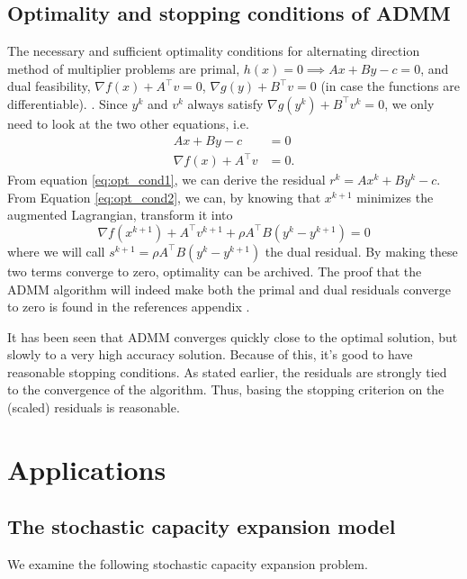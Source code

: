 \documentclass[a4paper]{artikel3}
\begin{document}
\subsection{Optimality and stopping conditions of ADMM}
The necessary and sufficient optimality conditions for alternating  direction  method  of  multiplier problems are primal, $h(x) = 0 \implies Ax + By - c = 0$, and dual feasibility, $\nabla f(x) + A^\top v = 0$, $ \nabla g(y) + B^\top v = 0$ (in case the functions are differentiable). \cite{boyd2011distributed}. Since $y^k$ and $v^k$ always satisfy $ \nabla g(y^k) + B^\top v^k = 0$, we only need to look at the two other equations, i.e.
\begin{align}
    Ax + By - c &= 0 \label{eq:opt_cond1}\\
    \nabla f(x) + A^\top v &= 0. \label{eq:opt_cond2}
\end{align}
From equation \ref{eq:opt_cond1}, we can derive the residual $r^k = Ax^k + By^k - c$. From Equation \ref{eq:opt_cond2}, we can, by knowing that $x^{k+1}$ minimizes the augmented Lagrangian, transform it into 
\begin{equation}
    \nabla f(x^{k+1}) + A^\top v^{k+1} + \rho A^\top B (y^k-y^{k+1}) = 0
\end{equation}
where we will call $s^{k+1}=\rho A^\top B (y^k-y^{k+1})$ the dual residual. By making these two terms converge to zero, optimality can be archived. The proof that the ADMM algorithm will indeed make both the primal and dual residuals converge to zero is found in the references appendix \cite{boyd2011distributed}.

It has been seen that ADMM converges quickly close to the optimal solution, but slowly to a very high accuracy solution. Because of this, it's good to have reasonable stopping conditions. As stated earlier, the residuals are strongly tied to the convergence of the algorithm. Thus, basing the stopping criterion on the (scaled) residuals is reasonable. 
\section{Applications}

\subsection{The stochastic capacity expansion model}
We examine the following stochastic capacity expansion problem. 
\end{document}
